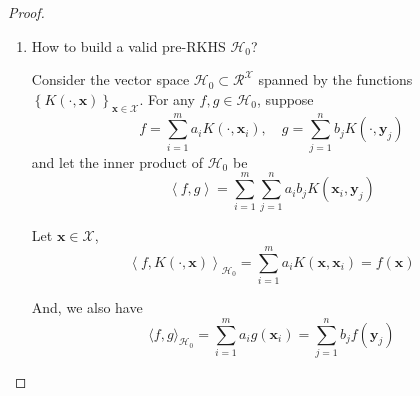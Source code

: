 \begin{proof}
    \begin{enumerate}
        \item How to build a valid pre-RKHS $\mathcal{H}_{0}$?

              Consider the vector space $\mathcal{H}_{0}\subset\mathcal{R}^{\mathcal{X}}$ spanned by the functions $\left\{K\left(\cdot,\mathbf{x}\right)\right\}_{\mathbf{x}\in\mathcal{X}}$. For any $f,g\in\mathcal{H}_{0}$, suppose
              \begin{equation*}
                  f=\sum_{i=1}^{m}a_{i}K\left(\cdot,\mathbf{x}_{i}\right),\quad g=\sum_{j=1}^{n}b_{j}K\left(\cdot,\mathbf{y}_{j}\right)
              \end{equation*}
              and let the inner product of $\mathcal{H}_{0}$ be
              \begin{equation}
                  \left\langle f,g\right\rangle=\sum_{i=1}^{m}\sum_{j=1}^{n}a_{i}b_{j}K\left(\mathbf{x}_{i},\mathbf{y}_{j}\right)
                  \label{eq:definition-pre-rkhs-inner-product}
              \end{equation}

              Let $\mathbf{x}\in\mathcal{X}$,
              \begin{equation*}
                  \left\langle f,K\left(\cdot,\mathbf{x}\right)\right\rangle_{\mathcal{H}_{0}}=\sum_{i=1}^{m}a_{i} K\left(\mathbf{x},\mathbf{x}_{i}\right)=f(\mathbf{x})
                  \label{eq:reproducing-kernel}
              \end{equation*}

              And, we also have
              \begin{equation*}
                  \langle f, g\rangle_{\mathcal{H}_{0}}=\sum_{i=1}^{m} a_{i} g\left(\mathbf{x}_{i}\right)=\sum_{j=1}^{n} b_{j} f\left(\mathbf{y}_{j}\right)
              \end{equation*}


\end{enumerate}
\end{proof}
